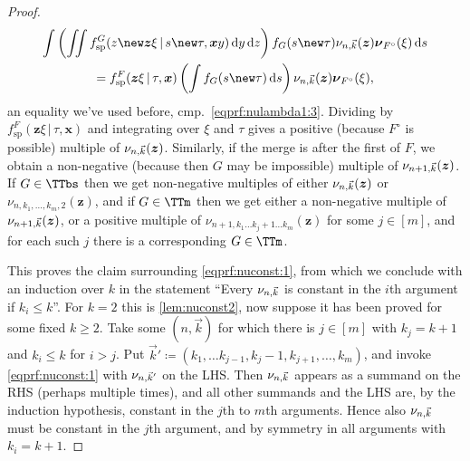 \documentclass[reqno,draft]{amsart}
\numberwithin{equation}{section}
\theoremstyle{plain}
\theoremstyle{remark}
\newcommand*\diff{\mathop{}\!\mathrm{d}}
\newcommand{\fsp}{f_\mathrm{sp}}
\newcommand{\nunk}{\nu_{n,\smash{\vec{k}}}}
\begin{document}
\begin{proof}
    \begin{multline*}
        \int \left( \iint \fsp^G(z\new\boldsymbol z\xi \,\vert\,s\new\tau,\boldsymbol xy) \diff y\diff z\right) f_G(s\new\tau) \nunk(\boldsymbol z) \boldsymbol \nu_{F^\circ }(\xi) \diff s\\
        = \fsp^F(\boldsymbol z\xi \,\vert\,\tau,\boldsymbol x) \left(\int f_G(s\new\tau) \diff s\right) \nunk(\boldsymbol z) \boldsymbol \nu_{F^\circ }(\xi),
    \end{multline*}
    an equality we've used before, cmp.\ \cref{eqprf:nulambda1:3}. Dividing by $\fsp^F(\boldsymbol z\xi \,\vert\,\tau,\boldsymbol x)$ and integrating over $\xi$ and $\tau$ gives a positive (because $F^\circ $ is possible) multiple of $\nunk(\boldsymbol z)$. Similarly, if the merge is after the first of $F$, we obtain a non-negative (because then $G$ may be impossible) multiple of $\nu_{n+1,\smash{\vec{k}}}(\boldsymbol z)$. If $G\in \TTbs$ then we get non-negative multiples of either $\nunk(\boldsymbol z)$ or $\nu_{n,k_1, \ldots ,k_m,2}(\boldsymbol z)$, and if $G\in \TTm$ then we get either a non-negative multiple of $\nu_{n+1,\smash{\vec{k}}}(\boldsymbol z)$, or a positive multiple of $\nu_{n+1,k_1\ldots k_j+1\ldots k_m}(\boldsymbol z)$ for some $j\in [m]$, and for each such $j$ there is a corresponding $G\in \TTm$.

    This proves the claim surrounding \cref{eqprf:nuconst:1}, from which we conclude with an induction over $k$ in the statement ``Every $\nunk$ is constant in the $i$th argument if $k_i \le k$''. For $k = 2$ this is \cref{lem:nuconst2}, now suppose it has been proved for some fixed $k \ge 2$. Take some $(n,\vec{k})$ for which there is $j\in [m]$ with $k_j = k+1$ and $k_i \le k$ for $i > j$. Put $\vec{k}' \coloneqq (k_1, \ldots k_{j-1},k_j-1,k_{j+1}, \ldots ,k_m)$, and invoke \cref{eqprf:nuconst:1} with $\nu_{n,\smash{\vec{k}'}}$ on the LHS. Then $\nunk$ appears as a summand on the RHS (perhaps multiple times), and all other summands and the LHS are, by the induction hypothesis, constant in the $j$th to $m$th arguments. Hence also $\nunk$ must be constant in the $j$th argument, and by symmetry in all arguments with $k_i = k+1$.
\end{proof}
\end{document}
